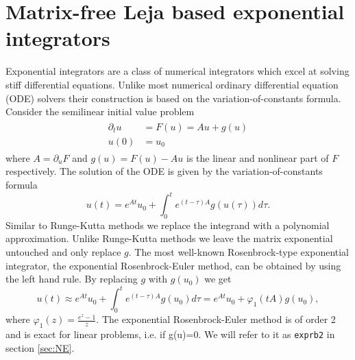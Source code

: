 \documentclass{scrartcl}
\begin{document}
	\section{Matrix-free Leja based exponential integrators} \label{expint}
	Exponential integrators are a class of numerical integrators which excel at solving stiff differential equations. Unlike most numerical ordinary differential equation (ODE) solvers their construction is based on the variation-of-constants formula. Consider the semilinear initial value problem
	\begin{align}
	\begin{split}
	\partial_tu &= F(u) = Au + g(u) \\ 
	u(0) &= u_0
	\end{split}\label{semilinear}
	\end{align}
	where $A = \partial_uF$ and $g(u) = F(u)-Au$ is the linear and nonlinear part of $F$ respectively. The solution of the ODE is given by the variation-of-constants formula
	\[
	u(t) = e^{At}u_0 + \int_{0}^{t}e^{(t-\tau)A}g(u(\tau))d\tau.
	\]
	Similar to Runge-Kutta methods we replace the integrand with a polynomial approximation. Unlike Runge-Kutta methods we leave the matrix exponential untouched and only replace $g$. The most well-known Rosenbrock-type exponential integrator, the exponential Rosenbrock-Euler method, can be obtained by using the left hand rule. By replacing $g$ with $g(u_0)$ we get
	\[
	u(t) \approx e^{At}u_0 + \int_{0}^{t}e^{(t-\tau)A}g(u_0)d\tau = e^{At}u_0 + \varphi_1(tA)g(u_0),
	\]
	where $\varphi_1(z) = \frac{e^z-1}z$. The exponential Rosenbrock-Euler method is of order 2 and is exact for linear problems, i.e. if g(u)=0. We will refer to it as \texttt{exprb2} in section \ref{sec:NE}.
\end{document}
